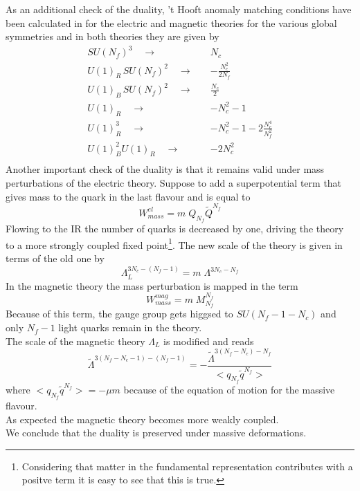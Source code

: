 As an additional check of the duality, 't Hooft anomaly matching conditions have been calculated  in \cite{Seiberg:1994pq} for the electric and magnetic theories for the various global symmetries and in both theories they are given by
\begin{equation}
\begin{aligned}
SU(N_f)^3 \quad \longrightarrow \quad   & N_c \\
U(1)_R\, SU(N_f)^2 \quad \longrightarrow \quad  & -\frac{N_c^2}{2 N_f} \\
U(1)_B\, SU(N_f)^2 \quad \longrightarrow \quad  & \frac{N_c}{2} \\
U(1)_R \quad \longrightarrow \quad  & -N_c^2 - 1 \\
U(1)_R^3 \quad \longrightarrow \quad  & -N_c^2 - 1 - 2 \frac{N_c^4}{N_f^2} \\
U(1)_B^2 U(1)_R \quad \longrightarrow \quad  & - 2 N_c^2 \\
\end{aligned}
\end{equation}
Another important check of the duality is that it remains valid under mass perturbations of the electric theory.
Suppose to add a superpotential term that gives mass to the quark in the last flavour and is equal to
\begin{equation}
	W_{mass}^{el} = m \; Q_{N_f} \tilde{Q}^{N_f}
\end{equation}
Flowing to the IR the number of quarks is decreased by one, driving the theory to a more strongly coupled fixed point\footnote{Considering that matter in the fundamental representation contributes with a positve term it is easy to see that this is true.}.
The new scale of the theory is given in terms of the old one by
\begin{equation}
 \Lambda_{L}^{3 N_c - (N_f - 1)} = m \; \Lambda^{3 N_c - N_f}
\end{equation}
In the magnetic theory the mass perturbation is mapped in the term
\begin{equation}
W_{mass}^{mag} = m \; M_{N_f}^{N_f}
\end{equation}
Because of this term, the gauge group gets higgsed to $SU(N_f-1 - N_c)$ and only $N_f -1$ light quarks remain in the theory. \\
The scale of the magnetic theory $\Lambda_L$ is modified and reads
\begin{equation}
\tilde{\Lambda}^{3(N_f - N_c -1) - (N_f -1)} = 
- \frac{
	\tilde{\Lambda}^{3 (N_f - N_c) - N_f}	
	}
	{
	< q_{N_f} \tilde{q}^{N_f}		>
	}
\end{equation}
where $< q_{N_f} \tilde{q}^{N_f}> = - \mu m $ because of the equation of motion for the massive flavour. \\
As expected the magnetic theory becomes more weakly coupled.\\
We conclude that the duality is preserved under massive deformations.  

